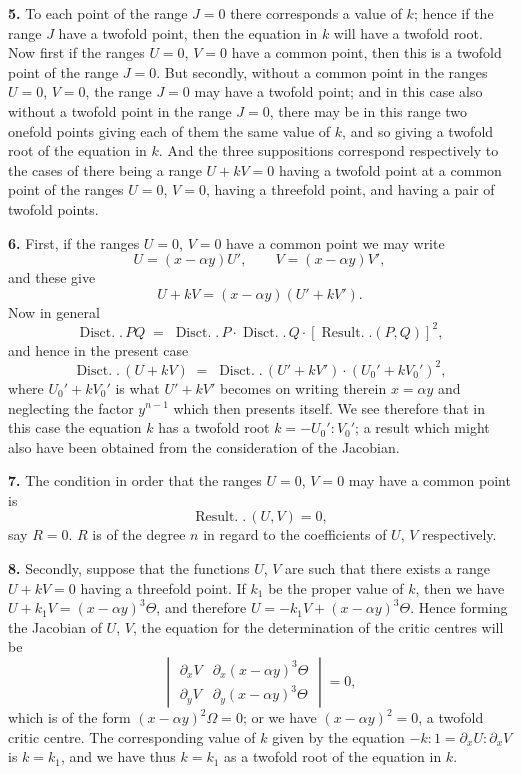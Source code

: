 \documentclass[11pt,a4paper]{article}
\providecommand{\Disct}{\operatorname{Disct.}}
\providecommand{\Result}{\operatorname{Result.}}
\begin{document}
\medskip

\textbf{5.} To each point of the range $J = 0$ there corresponds a value of $k$; hence if the range $J$ have a twofold point, then the equation in $k$ will have a twofold root. Now first if the ranges $U = 0$, $V = 0$ have a common point, then this is a twofold point of the range $J = 0$. But secondly, without a common point in the ranges $U = 0$, $V = 0$, the range $J = 0$ may have a twofold point; and in this case also without a twofold point in the range $J = 0$, there may be in this range two onefold points giving each of them the same value of $k$, and so giving a twofold root of the equation in $k$. And the three suppositions correspond respectively to the cases of there being a range $U + kV = 0$ having a twofold point at a common point of the ranges $U = 0$, $V = 0$, having a threefold point, and having a pair of twofold points.

\medskip

\textbf{6.} First, if the ranges $U = 0$, $V = 0$ have a common point we may write
\[
U = (x - \alpha y)U',\qquad V = (x - \alpha y)V',
\]
and these give
\[
U + kV = (x - \alpha y)(U' + kV').
\]
Now in general
\[
\Disct.\,PQ \;=\; \Disct.\,P\cdot\Disct.\,Q\cdot[\Result.(P, Q)]^2,
\]
and hence in the present case
\[
\Disct.\,(U + kV) \;=\; \Disct.\,(U' + kV')\cdot (U_0' + k V_0')^2,
\]
where $U_0' + kV_0'$ is what $U' + kV'$ becomes on writing therein $x = \alpha y$ and neglecting the factor $y^{n-1}$ which then presents itself. We see therefore that in this case the equation $k$ has a twofold root $k = -U_0' : V_0'$; a result which might also have been obtained from the consideration of the Jacobian.

\medskip

\textbf{7.} The condition in order that the ranges $U = 0$, $V = 0$ may have a common point is
\[
\Result.\,(U, V) = 0,
\]
say $R = 0$. $R$ is of the degree $n$ in regard to the coefficients of $U$, $V$ respectively.

\medskip

\textbf{8.} Secondly, suppose that the functions $U$, $V$ are such that there exists a range $U + kV = 0$ having a threefold point. If $k_1$ be the proper value of $k$, then we have $U + k_1 V = (x - \alpha y)^3 \Theta$, and therefore $U = -k_1 V + (x - \alpha y)^3 \Theta$. Hence forming the Jacobian of $U$, $V$, the equation for the determination of the critic centres will be
\[
\begin{vmatrix} \partial_x V & \partial_x(x - \alpha y)^3 \Theta\\ \partial_y V & \partial_y(x - \alpha y)^3 \Theta\end{vmatrix} = 0,
\]
which is of the form $(x - \alpha y)^2 \Omega = 0$; or we have $(x - \alpha y)^2 = 0$, a twofold critic centre. The corresponding value of $k$ given by the equation $-k : 1 = \partial_x U : \partial_x V$ is $k = k_1$, and we have thus $k = k_1$ as a twofold root of the equation in $k$.
\end{document}
